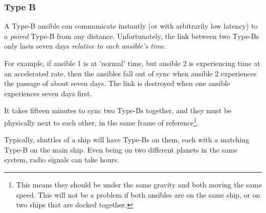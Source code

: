 \subsubsection{Type B}
\par
A Type-B ansible can communicate instantly (or with arbitrarily low latency) to a \textit{paired} Type-B from any distance. Unfortunately, the link between two Type-Bs only lasts seven days \textit{relative to each ansible's time}.

\par
For example, if ansible 1 is at 'normal' time, but ansible 2 is experiencing time at an accelerated rate, then the ansibles fall out of sync when ansible 2 experiences the passage of about seven days. The link is destroyed when one ansible experiences seven days first.

\par
It takes fifteen minutes to sync two Type-Bs together, and they must be physically next to each other, in the same frame of reference\footnote{This means they should be under the same gravity and both moving the same speed. This will not be a problem if both ansibles are on the same ship, or on two ships that are docked together.}.

\par
Typically, shuttles of a ship will have Type-Bs on them, each with a matching Type-B on the main ship. Even being on two different planets in the same system, radio signals can take hours.